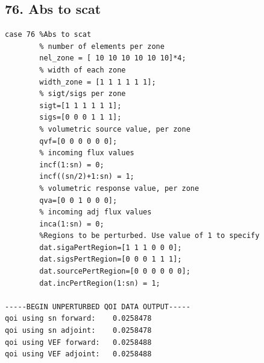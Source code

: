 \documentclass{article}
\begin{document}
\subsection{76. Abs to scat}
\begin{verbatim}
case 76 %Abs to scat
        % number of elements per zone
        nel_zone = [ 10 10 10 10 10 10]*4;
        % width of each zone
        width_zone = [1 1 1 1 1 1];
        % sigt/sigs per zone
        sigt=[1 1 1 1 1 1];
        sigs=[0 0 0 1 1 1];
        % volumetric source value, per zone
        qvf=[0 0 0 0 0 0];
        % incoming flux values
        incf(1:sn) = 0;
        incf((sn/2)+1:sn) = 1;
        % volumetric response value, per zone
        qva=[0 0 1 0 0 0];
        % incoming adj flux values
        inca(1:sn) = 0;
        %Regions to be perturbed. Use value of 1 to specify
        dat.sigaPertRegion=[1 1 1 0 0 0];
        dat.sigsPertRegion=[0 0 0 1 1 1];
        dat.sourcePertRegion=[0 0 0 0 0 0];
        dat.incPertRegion(1:sn) = 1;   
        
-----BEGIN UNPERTURBED QOI DATA OUTPUT----- 
qoi using sn forward: 	 0.0258478 
qoi using sn adjoint: 	 0.0258478 
qoi using VEF forward: 	 0.0258488 
qoi using VEF adjoint: 	 0.0258488 
\end{verbatim}
\end{document}
